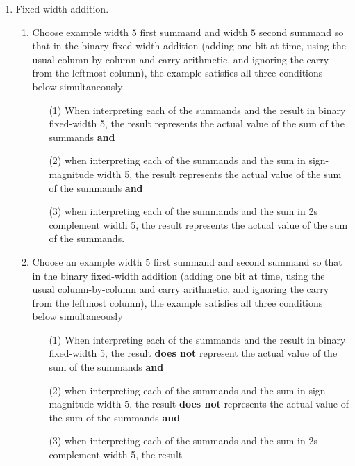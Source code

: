 \begin{enumerate}[labelindent=0pt, leftmargin=0pt]
        \item Fixed-width addition.  
        \begin{enumerate}
            \item\gradeCompleteFirst Choose example width $5$ first summand and width $5$ second summand so that 
            in the  binary fixed-width addition (adding one bit at time, using 
            the usual column-by-column and carry arithmetic, and ignoring the carry 
            from the  leftmost column), the example satisfies all three conditions below simultaneously
            \begin{itemize}
            \item[(1)] When interpreting each of the summands and the result in binary fixed-width 5, 
            the result represents the actual value of the sum of the summands {\bf and}
            \item[(2)] when interpreting each of the summands and the sum in sign-magnitude width 5, the result  
            represents the actual value of the sum of the summands {\bf and}
            \item[(3)] when interpreting each of the summands and the sum in 2s complement width 5, the result 
            represents the actual value of the sum of the summands.
            \end{itemize}
            \item\gradeCorrectFirst Choose an example width $5$ first summand and second summand so that 
            in the binary fixed-width addition (adding one bit at time, using 
            the usual column-by-column and carry arithmetic, and ignoring the carry 
            from the  leftmost column),  the example satisfies all three conditions below simultaneously
            \begin{itemize}
            \item[(1)] When interpreting each of the summands and the result in binary fixed-width 5, 
            the result {\bf does not} represent the actual value of the sum of the summands {\bf and}
            \item[(2)] when interpreting each of the summands and the sum in sign-magnitude width 5, the result  
            {\bf does not} represents the actual value of the sum of the summands {\bf and}
            \item[(3)] when interpreting each of the summands and the sum in 2s complement width 5, the result 

\end{itemize}
\end{enumerate}
\end{enumerate}
